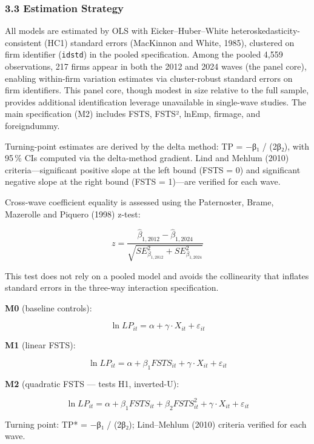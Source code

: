 \documentclass[12pt,a4paper]{article}
\begin{document}
\hypertarget{33-estimation-strategy}{%
\subsubsection{3.3 Estimation Strategy}\label{33-estimation-strategy}}

All models are estimated by OLS with Eicker--Huber--White
heteroskedasticity-consistent (HC1) standard errors (MacKinnon and
White, 1985), clustered on firm identifier (\texttt{idstd}) in the
pooled specification. Among the pooled 4,559 observations, 217 firms
appear in both the 2012 and 2024 waves (the \textquotesingle panel
core\textquotesingle), enabling within-firm variation estimates via
cluster-robust standard errors on firm identifiers. This panel core,
though modest in size relative to the full sample, provides additional
identification leverage unavailable in single-wave studies. The main
specification (M2) includes FSTS, FSTS², lnEmp, firmage, and
foreigndummy.

Turning-point estimates are derived by the delta method: TP = −β₁ /
(2β₂), with 95\,\% CIs computed via the delta-method gradient. Lind and
Mehlum (2010) criteria---significant positive slope at the left bound
(FSTS = 0) and significant negative slope at the right bound (FSTS =
1)---are verified for each wave.

Cross-wave coefficient equality is assessed using the Paternoster,
Brame, Mazerolle and Piquero (1998) z-test:

\[z = \frac{\hat{\beta}_{1,2012} - \hat{\beta}_{1,2024}}{\sqrt{SE^2_{\beta_{1,2012}} + SE^2_{\beta_{1,2024}}}}\]

This test does not rely on a pooled model and avoids the collinearity
that inflates standard errors in the three-way interaction
specification.

\textbf{M0} (baseline controls):

\[\ln LP_{it} = \alpha + \gamma \cdot X_{it} + \varepsilon_{it}\]

\textbf{M1} (linear FSTS):

\[\ln LP_{it} = \alpha + \beta_1 FSTS_{it} + \gamma \cdot X_{it} + \varepsilon_{it}\]

\textbf{M2} (quadratic FSTS --- tests H1, inverted-U):

\[\ln LP_{it} = \alpha + \beta_1 FSTS_{it} + \beta_2 FSTS^2_{it} + \gamma \cdot X_{it} + \varepsilon_{it}\]

Turning point: TP* = −β₁ / (2β₂); Lind--Mehlum (2010) criteria verified
for each wave.
\end{document}
